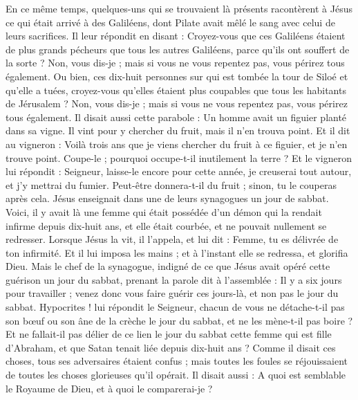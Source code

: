 \begin{multicols}{2}
\VerseOne{}En ce même temps, quelques-uns qui se trouvaient là présents racontèrent à Jésus ce qui était arrivé à des Galiléens, dont Pilate avait mêlé le sang avec celui de leurs sacrifices.
Il leur répondit en disant : Croyez-vous que ces Galiléens étaient de plus grands pécheurs que tous les autres Galiléens, parce qu'ils ont souffert de la sorte ?
Non, vous dis-je ; mais si vous ne vous repentez pas, vous périrez tous également.
Ou bien, ces dix-huit personnes sur qui est tombée la tour de Siloé et qu’elle a tuées, croyez-vous qu’elles étaient plus coupables que tous les habitants de Jérusalem ?
Non, vous dis-je ; mais si vous ne vous repentez pas, vous périrez tous également.
Il disait aussi cette parabole : Un homme avait un figuier planté dans sa vigne. Il vint pour y chercher du fruit, mais il n’en trouva point.
Et il dit au vigneron : Voilà trois ans que je viens chercher du fruit à ce figuier, et je n’en trouve point. Coupe-le ; pourquoi occupe-t-il inutilement la terre ?
Et le vigneron lui répondit : Seigneur, laisse-le encore pour cette année, je creuserai tout autour, et j’y mettrai du fumier.
Peut-être donnera-t-il du fruit ; sinon, tu le couperas après cela.
Jésus enseignait dans une de leurs synagogues un jour de sabbat.
Voici, il y avait là une femme qui était possédée d'un démon qui la rendait infirme depuis dix-huit ans, et elle était courbée, et ne pouvait nullement se redresser.
Lorsque Jésus la vit, il l'appela, et lui dit : Femme, tu es délivrée de ton infirmité.
Et il lui imposa les mains ; et à l’instant elle se redressa, et glorifia Dieu.
Mais le chef de la synagogue, indigné de ce que Jésus avait opéré cette guérison un jour du sabbat, prenant la parole dit à l'assemblée : Il y a six jours pour travailler ; venez donc vous faire guérir ces jours-là, et non pas le jour du sabbat.
Hypocrites ! lui répondit le Seigneur, chacun de vous ne détache-t-il pas son bœuf ou son âne de la crèche le jour du sabbat, et ne les mène-t-il pas boire ?
Et ne fallait-il pas délier de ce lien le jour du sabbat cette femme qui est fille d'Abraham, et que Satan tenait liée depuis dix-huit ans ?
Comme il disait ces choses, tous ses adversaires étaient confus ; mais toutes les foules se réjouissaient de toutes les choses glorieuses qu'il opérait.
\TextTitle{[grandeur]}
Il disait aussi : A quoi est semblable le Royaume de Dieu, et à quoi le comparerai-je ?

\end{multicols}
